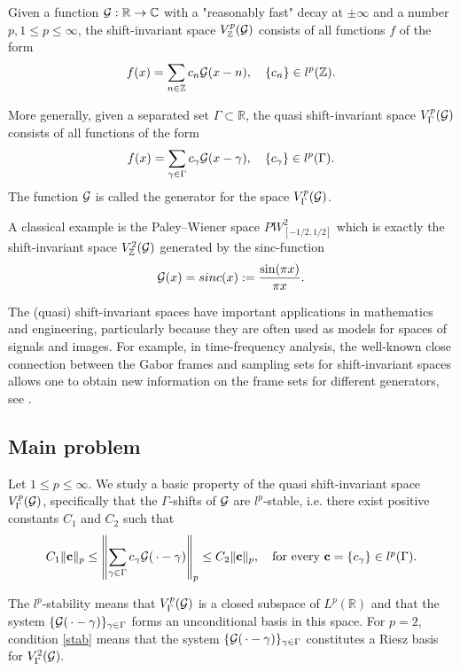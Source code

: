 \documentclass[12pt]{amsart}
\numberwithin{equation}{section}
\newcommand{\R}{{\mathbb R}} \newcommand{\Q}{{\mathbb Q}} \newcommand{\Z}{{\mathbb Z}} \newcommand{\N}{{\mathbb N}}
\newcommand{\Cc}{{\mathbb C}}\newcommand{\cc}{{\bf c}} \newcommand{\ab}{{\bf a}} \newcommand{\xx}{{\bf x}} \newcommand{\yy}{{\bf y}}\newcommand{\uu}{{\bf u}}
\newcommand{\sinc}{{\rm sinc}}
\begin{document}
Given  a  function $\Ff:\R\to \Cc$ with a "reasonably fast" decay at $\pm\infty$ and a number  $p,1\leq p\leq\infty$, the shift-invariant space $V_\Z^p(\Ff)$ consists of all functions $f$ of the form 
$$f(x)=\sum_{n\in\Z}c_n \Ff(x-n),\quad \{c_n\}\in l^p(\Z).$$ 

More generally, given a separated set $\Gamma\subset\R$, the quasi shift-invariant space $V_\Gamma^p(\mathcal{G})$ consists of all functions of the form 
\begin{equation}\label{f0}f(x)=\sum_{\gamma\in\Gamma}c_\gamma \Ff(x-\gamma),\quad \{c_\gamma\}\in l^p(\Gamma).\end{equation}
The function $\mathcal{G}$ is called the generator for the space $V_\Gamma^p(\mathcal{G})$.

A classical example is the Paley--Wiener space $PW^2_{[-1/2,1/2]}$ which is exactly the shift-invariant space $V^2_\Z(\Ff)$ generated by the sinc-function\begin{equation}\label{sinc}
  \Ff(x)=\sinc(x):=\frac{\sin(\pi x)}{\pi x}.  
\end{equation} 

The (quasi) shift-invariant spaces have important applications in mathematics and engineering, particularly because they are often used as models for spaces of signals and images. For example, in time-frequency analysis, the well-known close connection between the Gabor frames and sampling sets for shift-invariant spaces allows one to obtain new information on the frame sets for different generators, see \cite{grs, MR4047939, MR3053565,  MR4782146}.


\subsection{Main problem}
Let $1 \le p \le\infty.$ We study a basic property of the quasi shift-invariant space $V^p_\Gamma(\mathcal{G})$, specifically  that the $\Gamma$-shifts of $\mathcal{G}$ are $l^p$-stable, i.e. there exist positive constants $C_1$ and $C_2$ such that
\begin{equation}\label{stab}C_1\|\cc\|_p \le \left\|\sum_{\gamma \in \Gamma} c_{\gamma} \Ff(\,\cdot - \gamma) \right\|_p \le C_2 \|\cc\|_p,\quad \mbox{for every $\cc=\{c_\gamma\} \in l^p(\Gamma).$}\end{equation}


 The $l^p$-stability means that $V^p_\Gamma(\mathcal{G})$ is a closed subspace of $L^p(\R)$ and that the system $\{\mathcal{G}(\,\cdot - \gamma)\}_{\gamma \in \Gamma}$ forms an unconditional basis in this space. For $p=2$,  condition \eqref{stab} means that the system $\{\mathcal{G}(\,\cdot - \gamma)\}_{\gamma \in \Gamma}$ constitutes a Riesz basis for  $V^2_{\Gamma}(\mathcal{G}).$
\end{document}
